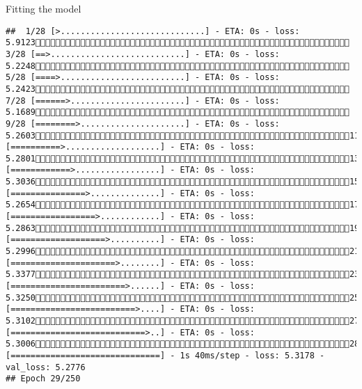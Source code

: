 \documentclass[
  ignorenonframetext,
]{beamer}
\begin{document}
\begin{frame}[fragile]{Fitting the model}
\begin{verbatim}
##  1/28 [>.............................] - ETA: 0s - loss: 5.9123 3/28 [==>...........................] - ETA: 0s - loss: 5.2248 5/28 [====>.........................] - ETA: 0s - loss: 5.2423 7/28 [======>.......................] - ETA: 0s - loss: 5.1689 9/28 [========>.....................] - ETA: 0s - loss: 5.260311/28 [==========>...................] - ETA: 0s - loss: 5.280113/28 [============>.................] - ETA: 0s - loss: 5.303615/28 [===============>..............] - ETA: 0s - loss: 5.265417/28 [=================>............] - ETA: 0s - loss: 5.286319/28 [===================>..........] - ETA: 0s - loss: 5.299621/28 [=====================>........] - ETA: 0s - loss: 5.337723/28 [=======================>......] - ETA: 0s - loss: 5.325025/28 [=========================>....] - ETA: 0s - loss: 5.310227/28 [===========================>..] - ETA: 0s - loss: 5.300628/28 [==============================] - 1s 40ms/step - loss: 5.3178 - val_loss: 5.2776
## Epoch 29/250

\end{verbatim}
\end{frame}
\end{document}
